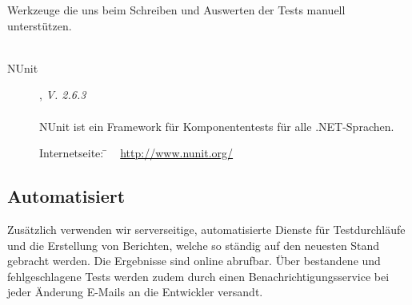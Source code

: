 Werkzeuge die uns beim Schreiben und Auswerten der Tests manuell unterstützen.
\\
\\

\begin{description}

	\item[NUnit], \textit{V. 2.6.3}\hfill
	\\
	\\
	NUnit ist ein Framework für Komponententests für alle .NET-Sprachen.
	
	\begin{tabbing}
		Internetseite:
		\= ~ \href {http://www.nunit.org/}
	    	       {http://www.nunit.org/}
	    \\
	\end{tabbing}
	
\end{description}

\subsection{Automatisiert}
\label{Abschnitt:Tests:Werkzeuge:Automatisiert}

Zusätzlich verwenden wir serverseitige, automatisierte Dienste für Testdurchläufe und die Erstellung von Berichten, welche so ständig auf den neuesten Stand gebracht werden. Die Ergebnisse sind online abrufbar. Über bestandene und fehlgeschlagene Tests werden zudem durch einen Benachrichtigungsservice bei jeder Änderung E-Mails an die Entwickler versandt.
\\
\\


